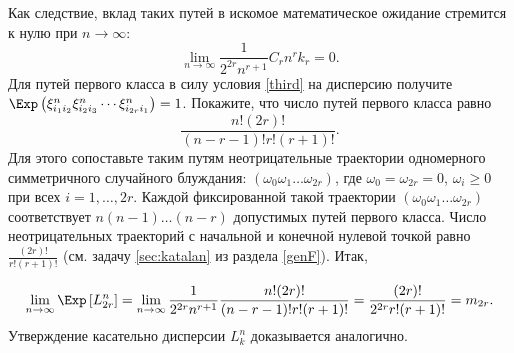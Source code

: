 \begin{ordre}
Как следствие, вклад таких путей в искомое математическое ожидание стремится к нулю при $n\to \infty $: \[\mathop{\lim }\limits_{n\to \infty } \frac{1}{2^{2r} n^{r+1} } C_{r} n^{r} k_{r} =0.\] Для путей первого класса в силу условия \ref{third} на дисперсию получите $\Exp \left(\xi _{i_{1} i_{2} }^{n} \xi _{i_{2} i_{3} }^{n} \cdots \xi _{i_{2r} i_{1} }^{n}\right) =1$. Покажите, что число путей первого класса равно \[\frac{n!(2r)!}{(n-r-1)!r!(r+1)!}. \] Для этого сопоставьте таким путям неотрицательные траектории одномерного симметричного случайного блуждания: $\left(\omega _{0} \omega _{1} \ldots \omega _{2r} \right)$, где $\omega _{0} =\omega _{2r} =0$, $\omega _{i} \ge 0$ при всех $i=1,\ldots ,2r$. Каждой фиксированной такой траектории $\left(\omega _{0} \omega _{1} \ldots \omega _{2r} \right)$ соответствует $n(n-1)\ldots (n-r)$ допустимых путей первого класса. Число неотрицательных траекторий с начальной и конечной нулевой точкой равно $\frac{(2r)!}{r!(r+1)!} $ (см. задачу \ref{sec:katalan} из раздела \ref{genF}).
Итак, 

\[\mathop{\lim }\limits_{n\to \infty } \Exp\left[L_{2r}^{n} \right]=\mathop{\lim }\limits_{n\to \infty } \frac{1}{2^{2r} n^{r+1} } \frac{n!(2r)!}{(n-r-1)!r!(r+1)!} =\frac{(2r)!}{2^{2r} r!(r+1)!} =m_{2r} .\] 
Утверждение касательно дисперсии $L_{k}^{n} $ доказывается аналогично.

\end{ordre}